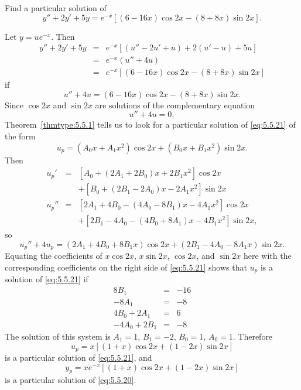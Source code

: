 \documentclass{ximera}
\begin{document}
\begin{example}\label{example:5.5.6} 
Find a particular solution of
\begin{equation} \label{eq:5.5.20}
y''+2y'+5y=e^{-x}\left[(6-16x)\cos2x-(8+8x)\sin2x\right].
\end{equation}


\begin{explanation}
Let $y=ue^{-x}$. Then
\begin{eqnarray*}
y''+2y'+5y&=&e^{-x}\left[(u''-2u'+u)+2(u'-u)+5u\right]\\
&=&e^{-x}(u''+4u)\\ &=&
e^{-x}\left[(6-16x)\cos2x-(8+8x)\sin2x\right]
\end{eqnarray*}
if
\begin{equation} \label{eq:5.5.21}
u''+4u=(6-16x)\cos2x-(8+8x)\sin2x.
\end{equation}
Since $\cos2x$  and $\sin2x$ are solutions of
the complementary equation
$$
u''+4u=0,
$$
 Theorem~\ref{thmtype:5.5.1} tells us to look for a particular solution
of \eqref{eq:5.5.21} of the form
$$
u_p=(A_0x+A_1x^2)\cos2x+(B_0x+B_1x^2)\sin2x.
$$
Then
\begin{eqnarray*}
u_p'&=&\left[A_0+(2A_1+2B_0)x+2B_1x^2\right]\cos2x \\ &&
+\left[B_0+(2B_1-2A_0)x-2A_1x^2\right]\sin2x\\ 
u_p''&=&\left[2A_1+4B_0-(4A_0-8B_1)x-4A_1x^2\right]\cos2x\\ &&
+\left[2B_1-4A_0-(4B_0+8A_1)x-4B_1x^2\right]\sin2x,
\end{eqnarray*}
so
$$
u_p''+4u_p=(2A_1+4B_0+8B_1x)\cos2x+(2B_1-4A_0-8A_1x)\sin2x.
$$
Equating the  coefficients of $x\cos2x$,
$x\sin2x$, $\cos2x$, and $\sin2x$  here with the
corresponding
coefficients on the right side of \eqref{eq:5.5.21} shows that $u_p$
is a solution of \eqref{eq:5.5.21} if
\begin{equation} \label{eq:5.5.22}
\begin{array}{rcr}
8B_1&=&-16\\
-8A_1&=&-8\\
4B_0+2A_1&=&6\\
-4A_0+2B_1&=&-8
\end{array}
\end{equation}
The solution of this system is  $A_1=1$, $B_1=-2$, $B_0=1$, $A_0=1$.
Therefore
$$
u_p=x[(1+x)\cos2x+(1-2x)\sin2x]
$$
is a particular solution of  \eqref{eq:5.5.21}, and
$$
y_p=xe^{-x}\left[(1+x)\cos2x+(1-2x)\sin2x\right]
$$
is a particular solution of  \eqref{eq:5.5.20}.
\end{explanation}
\end{example}
\end{document}
